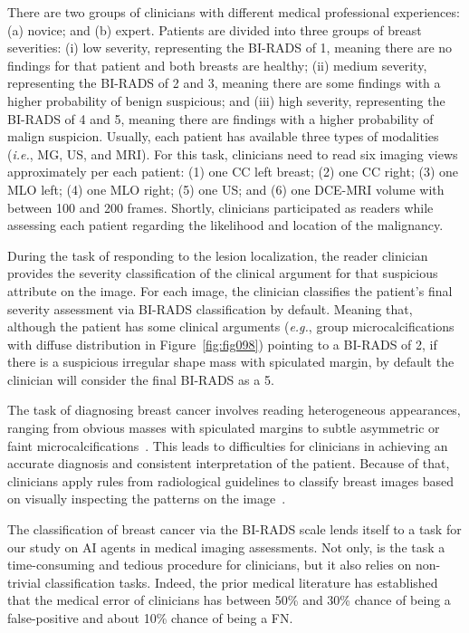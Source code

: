 There are two groups of clinicians with different medical professional experiences:
(a) novice; and
(b) expert.
Patients are divided into three groups of breast severities:
(i) low severity, representing the \ac{BI-RADS} of 1, meaning there are no findings for that patient and both breasts are healthy;
(ii) medium severity, representing the \ac{BI-RADS} of 2 and 3, meaning there are some findings with a higher probability of benign suspicious; and
(iii) high severity, representing the \ac{BI-RADS} of 4 and 5, meaning there are findings with a higher probability of malign suspicion.
Usually, each patient has available three types of modalities ({\it i.e.}, \ac{MG}, \ac{US}, and \ac{MRI}).
For this task, clinicians need to read six imaging views approximately per each patient:
(1) one \acs{CC} left breast;
(2) one \acs{CC} right;
(3) one \acs{MLO} left;
(4) one \acs{MLO} right;
(5) one \acs{US}; and
(6) one \acs{DCE-MRI} volume with between 100 and 200 frames.
Shortly, clinicians participated as readers while assessing each patient regarding the likelihood and location of the malignancy.

During the task of responding to the lesion localization, the reader clinician provides the severity classification of the clinical argument for that suspicious attribute on the image.
For each image, the clinician classifies the patient's final severity assessment via \ac{BI-RADS} classification by default.
Meaning that, although the patient has some clinical arguments ({\it e.g.}, group microcalcifications with diffuse distribution in Figure~\ref{fig:fig098}) pointing to a \ac{BI-RADS} of 2, if there is a suspicious irregular shape mass with spiculated margin, by default the clinician will consider the final \ac{BI-RADS} as a 5.

The task of diagnosing breast cancer involves reading heterogeneous appearances, ranging from obvious masses with spiculated margins to subtle asymmetric or faint microcalcifications~\cite{Sturesdotter2020}.
This leads to difficulties for clinicians in achieving an accurate diagnosis and consistent interpretation of the patient.
Because of that, clinicians apply rules from radiological guidelines to classify breast images based on visually inspecting the patterns on the image~\cite{doi:10.1148/radiol.2020192534}.

The classification of breast cancer via the \ac{BI-RADS} scale lends itself to a task for our study on AI agents in medical imaging assessments.
Not only, is the task a time-consuming and tedious procedure for clinicians, but it also relies on non-trivial classification tasks.
Indeed, the prior medical literature has established that the medical error of clinicians has between 50\% and 30\% chance of being a false-positive and about 10\% chance of being a \ac{FN}.

